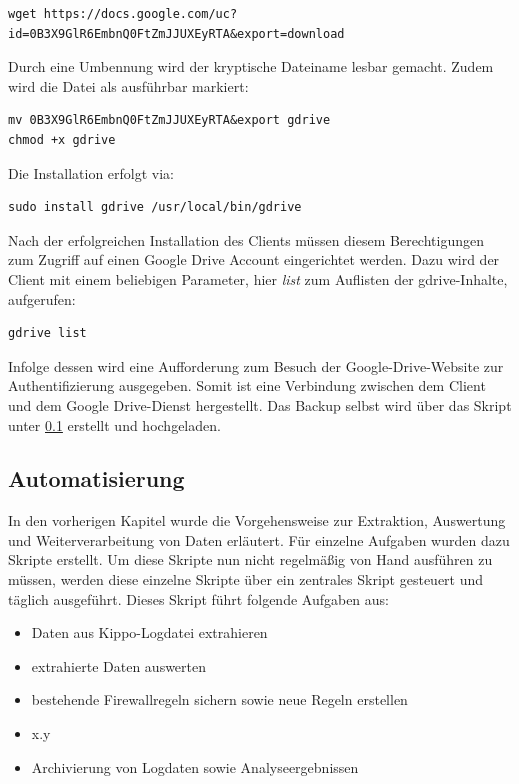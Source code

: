 \begin{lstlisting}[style=customc]
wget https://docs.google.com/uc?id=0B3X9GlR6EmbnQ0FtZmJJUXEyRTA&export=download
\end{lstlisting}

Durch eine Umbennung wird der kryptische Dateiname lesbar gemacht. Zudem wird die Datei als ausführbar markiert:

\begin{lstlisting}[style=customc]
mv 0B3X9GlR6EmbnQ0FtZmJJUXEyRTA&export gdrive
chmod +x gdrive
\end{lstlisting}

Die Installation erfolgt via:

\begin{lstlisting}[style=customc]
sudo install gdrive /usr/local/bin/gdrive
\end{lstlisting}

Nach der erfolgreichen Installation des Clients müssen diesem Berechtigungen zum Zugriff auf einen Google Drive Account eingerichtet werden. Dazu wird der Client mit einem beliebigen Parameter, hier \textit{list} zum Auflisten der gdrive-Inhalte, aufgerufen:

\begin{lstlisting}[style=customc]
gdrive list
\end{lstlisting}

Infolge dessen wird eine Aufforderung zum Besuch der Google-Drive-Website zur Authentifizierung ausgegeben. Somit ist eine Verbindung zwischen dem Client und dem Google Drive-Dienst hergestellt. Das Backup selbst wird über das Skript unter \ref{subsec:Automatisierung} erstellt und hochgeladen.


\subsection{Automatisierung}
\label{subsec:Automatisierung}

In den vorherigen Kapitel wurde die Vorgehensweise zur Extraktion, Auswertung und Weiterverarbeitung von Daten erläutert. Für einzelne Aufgaben wurden dazu Skripte erstellt. Um diese Skripte nun nicht regelmäßig von Hand ausführen zu müssen, werden diese einzelne Skripte über ein zentrales Skript gesteuert und täglich ausgeführt. Dieses Skript führt folgende Aufgaben aus:

\begin{itemize}
\item Daten aus Kippo-Logdatei extrahieren
\item extrahierte Daten auswerten
\item bestehende Firewallregeln sichern sowie neue Regeln erstellen
\item x.y
\item Archivierung von Logdaten sowie Analyseergebnissen
\end{itemize}

